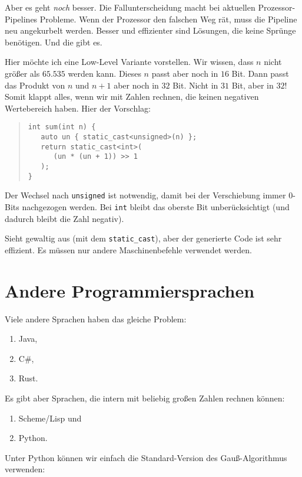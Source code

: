 \documentclass[a5paper,landscape,ngerman,10pt]{article}
\begin{document}
Aber es geht {\it noch\/} besser.
Die Fallunterscheidung macht bei aktuellen Prozessor-Pipelines
Probleme.
Wenn der Prozessor den falschen Weg rät, muss die
Pipeline neu angekurbelt werden.
Besser und effizienter sind Lösungen, die keine
Sprünge benötigen.
Und die gibt es.

Hier möchte ich eine Low-Level Variante vorstellen.
Wir wissen, dass $n$ nicht größer als $65.535$ werden
kann.
Dieses $n$ passt aber noch in $16$ Bit.
Dann passt das Produkt von $n$ und $n+1$ aber noch in
$32$ Bit.
Nicht in $31$ Bit, aber in $32$!
Somit klappt alles, wenn wir mit Zahlen rechnen, die
keinen negativen Wertebereich haben.
Hier der Vorschlag:

\begin{quotation}
\begin{lstlisting}
int sum(int n) {
   auto un { static_cast<unsigned>(n) };
   return static_cast<int>(
      (un * (un + 1)) >> 1
   );
}
\end{lstlisting}
\end{quotation}

Der Wechsel nach \lstinline!unsigned! ist notwendig, damit
bei der Verschiebung immer $0$-Bits nachgezogen werden.
Bei \lstinline!int! bleibt das oberste Bit unberücksichtigt
(und dadurch bleibt die Zahl negativ).

Sieht gewaltig aus (mit dem \lstinline!static_cast!), aber
der generierte Code ist sehr effizient.
Es müssen nur andere Maschinenbefehle verwendet werden.

\section{Andere Programmiersprachen}

Viele andere Sprachen haben das gleiche Problem:

\begin{enumerate}
 \item Java,
 \item C\#,
 \item Rust.
\end{enumerate}

Es gibt aber Sprachen, die intern mit beliebig großen
Zahlen rechnen können:

\begin{enumerate}
 \item Scheme/Lisp und
 \item Python.
\end{enumerate}

Unter Python können wir einfach die Standard-Version
des Gauß-Algorithmus verwenden:
\end{document}
